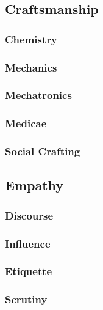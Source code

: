 \subsection{Craftsmanship}

\subsubsection{Chemistry}

\subsubsection{Mechanics}

\subsubsection{Mechatronics}

\subsubsection{Medicae}

\subsubsection{Social Crafting}


\subsection{Empathy}

\subsubsection{Discourse}

\subsubsection{Influence}

\subsubsection{Etiquette}

\subsubsection{Scrutiny}


